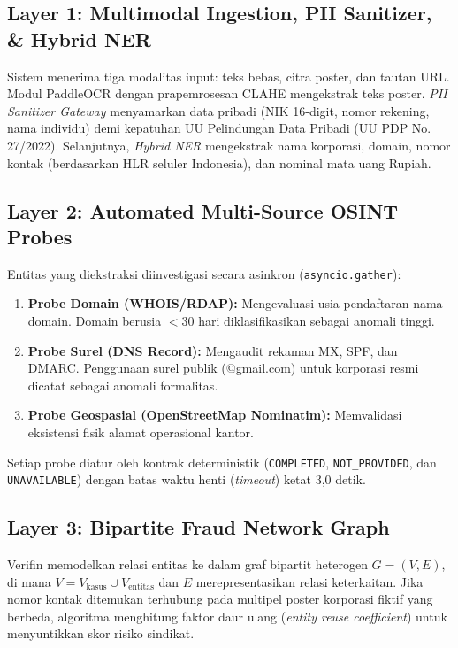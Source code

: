 \documentclass[conference]{IEEEtran}
\begin{document}
\subsection{Layer 1: Multimodal Ingestion, PII Sanitizer, \& Hybrid NER}
Sistem menerima tiga modalitas input: teks bebas, citra poster, dan tautan URL. Modul PaddleOCR dengan prapemrosesan CLAHE mengekstrak teks poster. \textit{PII Sanitizer Gateway} menyamarkan data pribadi (NIK 16-digit, nomor rekening, nama individu) demi kepatuhan UU Pelindungan Data Pribadi (UU PDP No. 27/2022). Selanjutnya, \textit{Hybrid NER} mengekstrak nama korporasi, domain, nomor kontak (berdasarkan HLR seluler Indonesia), dan nominal mata uang Rupiah.

\subsection{Layer 2: Automated Multi-Source OSINT Probes}
Entitas yang diekstraksi diinvestigasi secara asinkron (\texttt{asyncio.gather}):
\begin{enumerate}
    \item \textbf{Probe Domain (WHOIS/RDAP):} Mengevaluasi usia pendaftaran nama domain. Domain berusia $<30$ hari diklasifikasikan sebagai anomali tinggi.
    \item \textbf{Probe Surel (DNS Record):} Mengaudit rekaman MX, SPF, dan DMARC. Penggunaan surel publik (@gmail.com) untuk korporasi resmi dicatat sebagai anomali formalitas.
    \item \textbf{Probe Geospasial (OpenStreetMap Nominatim):} Memvalidasi eksistensi fisik alamat operasional kantor.
\end{enumerate}
Setiap probe diatur oleh kontrak deterministik (\texttt{COMPLETED}, \texttt{NOT\_PROVIDED}, dan \texttt{UNAVAILABLE}) dengan batas waktu henti (\textit{timeout}) ketat 3,0 detik.

\subsection{Layer 3: Bipartite Fraud Network Graph}
Verifin memodelkan relasi entitas ke dalam graf bipartit heterogen $G = (V, E)$, di mana $V = V_{\text{kasus}} \cup V_{\text{entitas}}$ dan $E$ merepresentasikan relasi keterkaitan. Jika nomor kontak ditemukan terhubung pada multipel poster korporasi fiktif yang berbeda, algoritma menghitung faktor daur ulang (\textit{entity reuse coefficient}) untuk menyuntikkan skor risiko sindikat.
\end{document}
